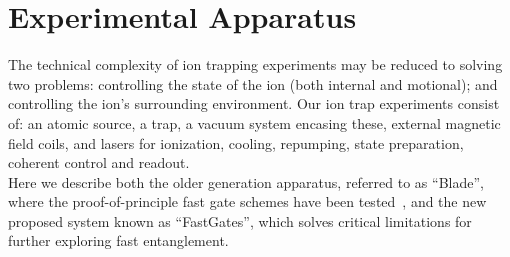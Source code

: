 \documentclass[12pt]{iopart}
\begin{document}


\section{Experimental Apparatus}

The technical complexity of ion trapping experiments may be reduced to
solving two problems: controlling the state of the ion (both internal
and motional); and controlling the ion's surrounding environment.
Our ion trap experiments consist of: an atomic source, a trap, a
vacuum system encasing these, external magnetic field coils, and
lasers for ionization, cooling, repumping, state preparation, coherent
control and readout.\\
Here we describe both the older generation apparatus, referred to as ``Blade'',
where the proof-of-principle fast gate schemes have been tested~\cite{saner_breaking_2023, shafer_fast_2018}, and the new proposed system known as
``FastGates'', which solves critical limitations for further exploring
fast entanglement.
\end{document}
